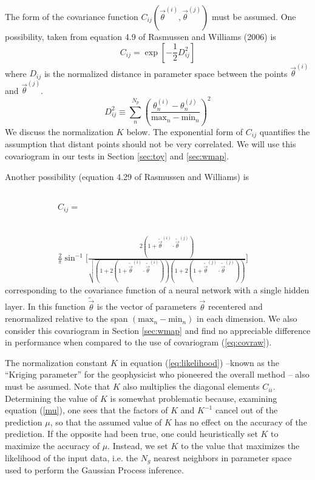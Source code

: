 \documentclass[useAMS,usenatbib]{aastex}
\begin{document}
The form of the covariance function 
$C_{ij}(\vec{\theta}^{(i)},\vec{\theta}^{(j)})$ must be
assumed.  One possibility, 
taken from equation 4.9 of Rasmussen and Williams (2006) is
\begin{equation}
\label{eq:covraw}
C_{ij}=\exp\left[-\frac{1}{2}D^2_{ij}\right]
\end{equation}
where $D_{ij}$ is the normalized distance in parameter space between the points 
$\vec{\theta}^{(i)}$
and $\vec{\theta}^{(j)}$.
\begin{equation}
D^2_{ij}\equiv\sum_n^{N_p}\left(\frac{\theta^{(i)}_n-\theta^{(j)}_n}{\text{max}_n-\text{min}_n}\right)^2
\end{equation}
We discuss the normalization $K$ below.
The exponential form of $C_{ij}$ quantifies the assumption 
that distant points should
not be very correlated.  We will use this covariogram in
our tests in Section \ref{sec:toy} and \ref{sec:wmap}.

Another possibility (equation 4.29 of Rasmussen and Williams) is
\begin{eqnarray}
C_{ij}=\phantom{\sin
\bigg[\frac{2(1+\tilde{\vec{\theta}}^{(i)}\cdot\tilde{\vec{\theta}}^{(j)})}
{\sqrt{(1+2(1+\tilde{\vec{\theta}}^{(i)}\cdot\tilde{\vec{\theta}}^{(i)}))
(1+2(1+\tilde{\vec{\theta}}^{(j)}\cdot\tilde{\vec{\theta}}^{(j)}))}}\bigg]}
\label{eq:cov_nn}\\
\frac{2}{\pi}\sin^{-1}
\bigg[\frac{2(1+\tilde{\vec{\theta}}^{(i)}\cdot\tilde{\vec{\theta}}^{(j)})}
{\sqrt{(1+2(1+\tilde{\vec{\theta}}^{(i)}\cdot\tilde{\vec{\theta}}^{(i)}))
(1+2(1+\tilde{\vec{\theta}}^{(j)}\cdot\tilde{\vec{\theta}}^{(j)}))}}\bigg]
\nonumber
\end{eqnarray}
corresponding to the covariance function of a neural network with a single
hidden layer.  In this function $\tilde{\vec{\theta}}$ is the vector of
parameters $\vec{\theta}$ recentered and renormalized relative to the span
$(\text{max}_n-\text{min}_n)$ in each dimension.  We also consider this
covariogram in Section \ref{sec:wmap} and find no appreciable difference
in performance when compared to the use of covariogram (\ref{eq:covraw}).

The normalization constant $K$ in equation (\ref{eq:likelihood}) --known as the
``Kriging parameter'' for the geophysicist who pioneered the overall method -- 
also
must be assumed.  Note that $K$ also multiplies the diagonal elements
$C_{ii}$.  Determining the value of $K$ 
is somewhat problematic because, examining equation
(\ref{mu}), one sees that the factors of $K$ and $K^{-1}$
cancel out of
the prediction $\mu$, so that the assumed value of $K$ has no effect on the accuracy
of the prediction.  
If the opposite had been true, one could heuristically set $K$ to
maximize the accuracy of $\mu$.  
Instead, we set $K$ to the value that maximizes the likelihood
of the input data, i.e. the $N_g$ nearest neighbors in parameter space
used to perform the Gaussian Process inference.
\end{document}
